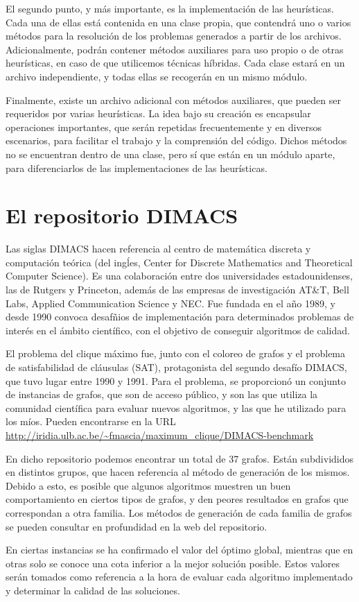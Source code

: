 El segundo punto, y más importante, es la implementación de las heurísticas.
Cada una de ellas está contenida en una clase propia, que contendrá uno o varios
métodos para la resolución de los problemas generados a partir de los archivos.
Adicionalmente, podrán contener métodos auxiliares para uso propio o de otras
heurísticas, en caso de que utilicemos técnicas híbridas. Cada clase estará
en un archivo independiente, y todas ellas se recogerán en un mismo módulo.

Finalmente, existe un archivo adicional con métodos auxiliares, que pueden ser
requeridos por varias heurísticas. La idea bajo su creación es encapsular
operaciones importantes, que serán repetidas frecuentemente y en diversos
escenarios, para facilitar el trabajo y la comprensión del código. Dichos
métodos no se encuentran dentro de una clase, pero sí que están en un
módulo aparte, para diferenciarlos de las implementaciones de las heurísticas.


\section{El repositorio DIMACS}
Las siglas DIMACS hacen referencia al centro de matemática discreta y computación teórica
(del ingĺes, Center for Discrete Mathematics and Theoretical Computer Science). Es una colaboración
entre dos universidades estadounidenses, las de Rutgers y Princeton, además de las empresas de
investigación AT\&T, Bell Labs, Applied Communication Science y NEC. Fue fundada en el año 1989,
y desde 1990 convoca desafñios de implementación para determinados problemas de interés en
el ámbito científico, con el objetivo de conseguir algoritmos de calidad.

El problema del clique máximo fue, junto con el coloreo de grafos y el problema de satisfabilidad
de cláusulas (SAT), protagonista del segundo desafío DIMACS, que tuvo lugar entre 1990 y 1991.
Para el problema, se proporcionó un conjunto de instancias de grafos, que son de acceso público,
y son las que utiliza la comunidad científica para evaluar nuevos algoritmos, y las que he utilizado
para los míos. Pueden encontrarse en la URL \url{http://iridia.ulb.ac.be/~fmascia/maximum_clique/DIMACS-benchmark}

En dicho repositorio podemos encontrar un total de 37 grafos. Están subdivididos en distintos grupos,
que hacen referencia al método de generación de los mismos. Debido a esto, es posible que algunos
algoritmos muestren un buen comportamiento en ciertos tipos de grafos, y den peores resultados en
grafos que correspondan a otra familia. Los métodos de generación de cada familia de grafos se pueden
consultar en profundidad en la web del repositorio.

En ciertas instancias se ha confirmado el valor del óptimo global, mientras que en otras solo se conoce
una cota inferior a la mejor solución posible. Estos valores serán tomados como referencia a la hora
de evaluar cada algoritmo implementado y determinar la calidad de las soluciones. 
